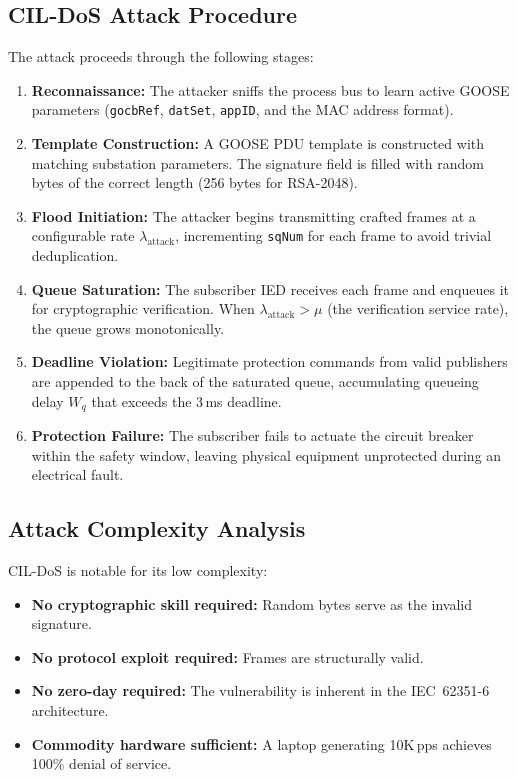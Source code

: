 \documentclass[journal]{IEEEtran}
\begin{document}
\subsection{CIL-DoS Attack Procedure}
The attack proceeds through the following stages:
\begin{enumerate}[leftmargin=*]
    \item \textbf{Reconnaissance:} The attacker sniffs the process bus to learn active GOOSE parameters (\texttt{gocbRef}, \texttt{datSet}, \texttt{appID}, and the MAC address format).
    \item \textbf{Template Construction:} A GOOSE PDU template is constructed with matching substation parameters. The signature field is filled with random bytes of the correct length (256 bytes for RSA-2048).
    \item \textbf{Flood Initiation:} The attacker begins transmitting crafted frames at a configurable rate $\lambda_{\text{attack}}$, incrementing \texttt{sqNum} for each frame to avoid trivial deduplication.
    \item \textbf{Queue Saturation:} The subscriber IED receives each frame and enqueues it for cryptographic verification. When $\lambda_{\text{attack}} > \mu$ (the verification service rate), the queue grows monotonically.
    \item \textbf{Deadline Violation:} Legitimate protection commands from valid publishers are appended to the back of the saturated queue, accumulating queueing delay $W_q$ that exceeds the 3\,ms deadline.
    \item \textbf{Protection Failure:} The subscriber fails to actuate the circuit breaker within the safety window, leaving physical equipment unprotected during an electrical fault.
\end{enumerate}

\subsection{Attack Complexity Analysis}
CIL-DoS is notable for its low complexity:
\begin{itemize}[leftmargin=*]
    \item \textbf{No cryptographic skill required:} Random bytes serve as the invalid signature.
    \item \textbf{No protocol exploit required:} Frames are structurally valid.
    \item \textbf{No zero-day required:} The vulnerability is inherent in the IEC~62351-6 architecture.
    \item \textbf{Commodity hardware sufficient:} A laptop generating 10K\,pps achieves 100\% denial of service.
\end{itemize}
\end{document}
